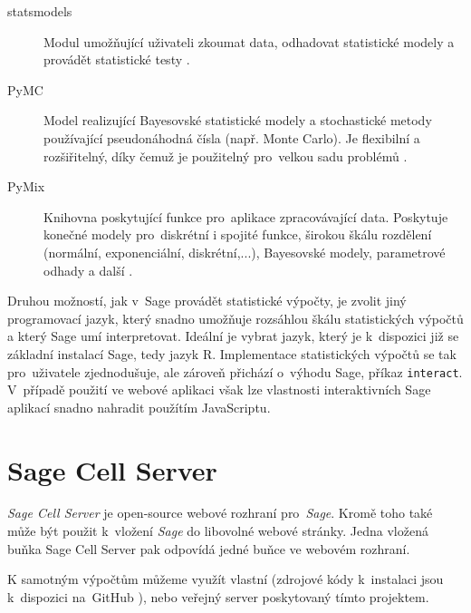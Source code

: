 \documentclass[thesis=B,czech]{FITthesis}[2012/06/26]
\begin{document}
\begin{description}
\item[statsmodels] \begin{sloppypar} Modul umožňující uživateli zkoumat data, odhadovat statistické modely a provádět statistické testy \cite{statsmodels}. \end{sloppypar}

\item[PyMC] \begin{sloppypar} Model realizující Bayesovské statistické modely a stochastické metody používající pseudonáhodná čísla (např. Monte Carlo). Je flexibilní a rozšiřitelný, díky čemuž je použitelný pro~velkou sadu problémů \cite{PyMC}. \end{sloppypar}

\item[PyMix] \begin{sloppypar} Knihovna poskytující funkce pro~aplikace zpracovávající data. Poskytuje konečné modely pro~diskrétní i spojité funkce, širokou škálu rozdělení (normální, exponenciální, diskrétní,...), Bayesovské modely, parametrové odhady a další \cite{PyMix}.\end{sloppypar}

\end{description}

Druhou možností, jak v~Sage provádět statistické výpočty, je zvolit jiný programovací jazyk, který snadno umožňuje rozsáhlou škálu statistických výpočtů a který Sage umí interpretovat. Ideální je vybrat jazyk, který je k~dispozici již se základní instalací Sage, tedy jazyk R. Implementace statistických výpočtů se tak pro~uživatele zjednodušuje, ale zároveň přichází o~výhodu Sage, příkaz \texttt{interact}. V~případě použití ve webové aplikaci však lze vlastnosti interaktivních Sage aplikací snadno nahradit použítím JavaScriptu.

\section{Sage Cell Server}

\textit{Sage Cell Server} je open-source webové rozhraní pro~\textit{Sage}. Kromě toho také může být použit k~vložení \textit{Sage} do libovolné webové stránky. Jedna vložená buňka Sage Cell Server pak odpovídá jedné buňce ve webovém rozhraní.

K samotným výpočtům můžeme využít vlastní (zdrojové kódy k~instalaci jsou k~dispozici na~GitHub \cite{sagemathGithub}), nebo veřejný server poskytovaný tímto projektem. 
\end{document}
